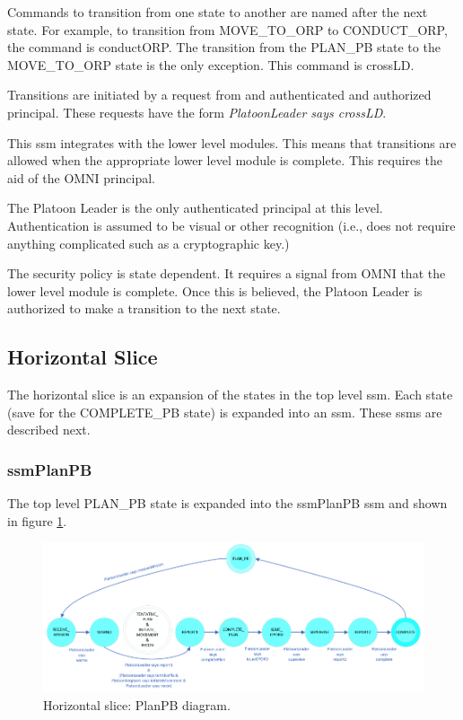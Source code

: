 \documentclass[../../main/main.tex]{subfiles}
\begin{document}
Commands to transition from one state to another are named after the next state.  For example, to transition from MOVE_TO_ORP to CONDUCT_ORP, the command is conductORP.  The transition from the PLAN_PB state to the MOVE_TO_ORP state is the only exception.  This command is crossLD.  

Transitions are initiated by a request from and authenticated and authorized principal.  These requests have the form \textit{PlatoonLeader says crossLD}.

This \gls{ssm} integrates with the lower level modules.  This means that transitions are allowed when the appropriate lower level module is complete.  This requires the aid of the OMNI principal.

The Platoon Leader is the only authenticated principal at this level.  Authentication is assumed to be visual or other recognition (i.e., does not require anything complicated such as a cryptographic key.)

The security policy is state dependent.  It requires a signal from OMNI that the lower level module is complete.  Once this is believed, the Platoon Leader is authorized to make a transition to the next state.  

 \clearpage

\subsection{Horizontal Slice}\label{ssec:horizontalslice}
The horizontal slice is an expansion of the states in the top level \gls{ssm}.  Each state (save for the COMPLETE_PB state) is expanded into an \gls{ssm}.  These \gls{ssm}s are described next.

\subsubsection{ssmPlanPB}\label{sssec:ssmPlanPB}
The top level PLAN_PB state is expanded into the ssmPlanPB \gls{ssm} and shown in figure \ref{ssmPlanPBDiagram}.

\begin{figure}[h!]
\centering
\includegraphics[width=\textwidth]{../figures/ssmPlanPBDiagram}
\caption{\label{ssmPlanPBDiagram} Horizontal slice: PlanPB diagram.}
\end{figure}
\end{document}
